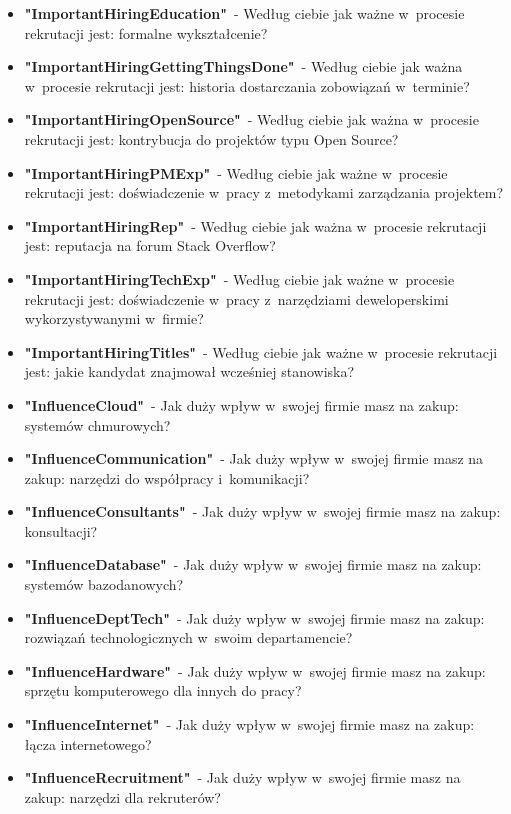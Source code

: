 \begin{appendices}
\begin{itemize}
        \item \textbf{"ImportantHiringEducation"}~- Według ciebie jak ważne w~procesie rekrutacji jest: formalne wykształcenie?
        \item \textbf{"ImportantHiringGettingThingsDone"}~- Według ciebie jak ważna w~procesie rekrutacji jest: historia dostarczania zobowiązań w~terminie?
        \item \textbf{"ImportantHiringOpenSource"}~- Według ciebie jak ważna w~procesie rekrutacji jest: kontrybucja do projektów typu Open Source?
        \item \textbf{"ImportantHiringPMExp"}~- Według ciebie jak ważne w~procesie rekrutacji jest: doświadczenie w~pracy z~metodykami zarządzania projektem?
        \item \textbf{"ImportantHiringRep"}~- Według ciebie jak ważna w~procesie rekrutacji jest: reputacja na forum Stack Overflow?
        \item \textbf{"ImportantHiringTechExp"}~- Według ciebie jak ważne w~procesie rekrutacji jest: doświadczenie w~pracy z~narzędziami deweloperskimi wykorzystywanymi w~firmie?
        \item \textbf{"ImportantHiringTitles"}~- Według ciebie jak ważne w~procesie rekrutacji jest: jakie kandydat znajmował wcześniej stanowiska?
        \item \textbf{"InfluenceCloud"}~- Jak duży wpływ w~swojej firmie masz na zakup: systemów chmurowych?
        \item \textbf{"InfluenceCommunication"}~- Jak duży wpływ w~swojej firmie masz na zakup: narzędzi do współpracy i~komunikacji?
        \item \textbf{"InfluenceConsultants"}~- Jak duży wpływ w~swojej firmie masz na zakup: konsultacji?
        \item \textbf{"InfluenceDatabase"}~- Jak duży wpływ w~swojej firmie masz na zakup: systemów bazodanowych?
        \item \textbf{"InfluenceDeptTech"}~- Jak duży wpływ w~swojej firmie masz na zakup: rozwiązań technologicznych w~swoim departamencie?
        \item \textbf{"InfluenceHardware"}~- Jak duży wpływ w~swojej firmie masz na zakup: sprzętu komputerowego dla innych do pracy?
        \item \textbf{"InfluenceInternet"}~- Jak duży wpływ w~swojej firmie masz na zakup: łącza internetowego?
        \item \textbf{"InfluenceRecruitment"}~- Jak duży wpływ w~swojej firmie masz na zakup: narzędzi dla rekruterów?

\end{itemize}
\end{appendices}
